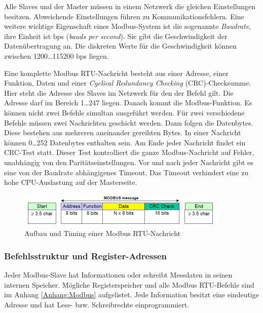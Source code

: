 Alle Slaves und der Master müssen in einem Netzwerk die gleichen Einstellungen besitzen. Abweichende Einstellungen führen zu Kommunikationsfehlern. Eine weitere wichtige Eigenschaft eines Modbus-System ist die sogenannte \textit{Baudrate}, ihre Einheit ist bps (\textit{bauds per second}). Sie gibt die Geschwindigkeit der Datenübertragung an. Die diskreten Werte für die Geschwindigkeit können zwischen 1200\dots 115200 bps liegen. 


Eine komplette Modbus RTU-Nachricht besteht aus einer Adresse, einer Funktion, Daten und einer \textit{Cyclical Redundancy Checking} (CRC)-Checksumme. Hier steht die Adresse des Slaves im Netzwerk für den der Befehl gilt. Die Adresse darf im Bereich 1\dots 247 liegen.
Danach kommt die Modbus-Funktion. Es können nicht zwei Befehle simultan ausgeführt werden. Für zwei verschiedene Befehle müssen zwei Nachrichten geschickt werden. 
Dann folgen die Datenbytes. Diese bestehen aus mehreren aneinander gereihten Bytes. In einer Nachricht können 0\dots 252 Datenbytes enthalten sein. 
Am Ende jeder Nachricht findet ein CRC-Test statt. Dieser Test kontrolliert die ganze Modbus-Nachricht auf Fehler, unabhängig von den Paritätseinstellungen.
Vor und nach jeder Nachricht gibt es eine von der Baudrate abhängigenes Timeout. Das Timeout verhindert eine zu hohe CPU-Auslastung auf der Masterseite.\citep{MODBUS.ORG2002} \citep{Schleicher2005}


\begin{figure}[htb]
\centering		\includegraphics[width=0.90\textwidth]{Pictures/Versuchsaufbau/Modbus_Frame.png}
\caption{Aufbau und Timing einer Modbus RTU-Nachricht \citep{MODBUS.ORG2002}}
\label{fig:}
\end{figure}

\subsubsection*{Befehlsstruktur und Register-Adressen}

Jeder Modbus-Slave hat Informationen oder schreibt Messdaten in seinen internen Speicher. Mögliche Registerspeicher und alle Modbus RTU-Befehle sind im Anhang \ref{Anhang:Modbus} aufgelistet.
Jede Information besitzt eine eindeutige Adresse und hat Lese- bzw. Schreibrechte einprogrammiert.


